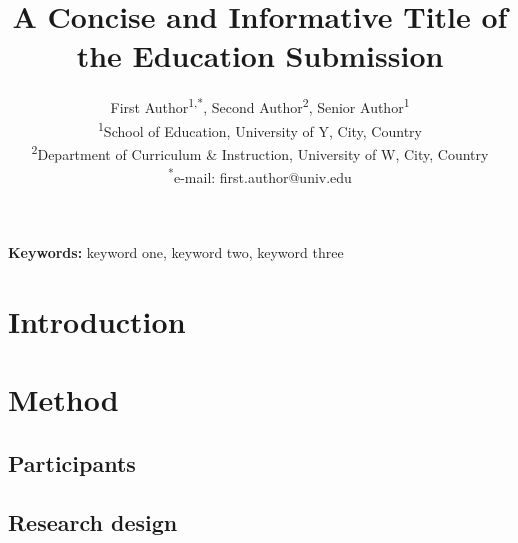 \documentclass[11pt,a4paper]{article}
\title{A Concise and Informative Title of the Education Submission}
\author{First Author\textsuperscript{1,*}, Second Author\textsuperscript{2}, Senior Author\textsuperscript{1}\\
\textsuperscript{1}School of Education, University of Y, City, Country\\
\textsuperscript{2}Department of Curriculum \& Instruction, University of W, City, Country\\
\textsuperscript{*}e-mail: first.author@univ.edu}
\date{}
\begin{document}
\maketitle

\begin{abstract}
\end{abstract}

\noindent\textbf{Keywords:} %
keyword one, keyword two, keyword three

\section{Introduction}
\label{sec:intro}

\section{Method}
\label{sec:method}

\subsection{Participants}

\subsection{Research design}
\end{document}
